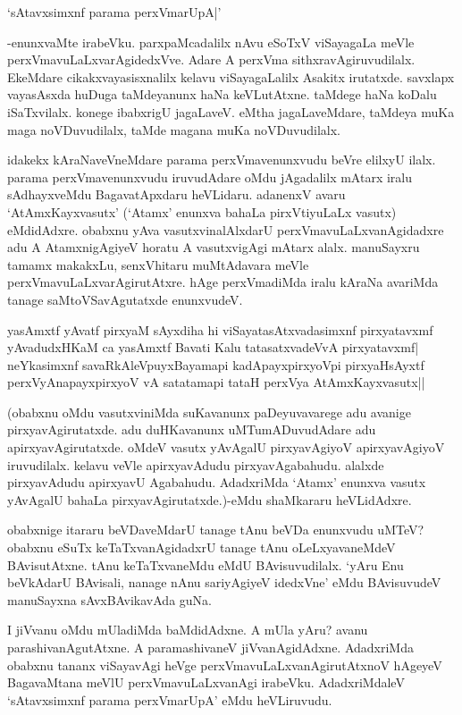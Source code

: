 \begin{shloka}
`sAtavxsimxnf parama perxVmarUpA|'
\end{shloka}

-enunxvaMte irabeVku. parxpaMcadalilx nAvu eSoTxV viSayagaLa meVle perxVmavuLaLxvarAgidedxVve. Adare A perxVma sithxravAgiruvudilalx. EkeMdare cikakxvayasisxnalilx kelavu viSayagaLalilx Asakitx irutatxde. savxlapx vayasAsxda huDuga taMdeyanunx haNa keVLutAtxne. taMdege haNa koDalu iSaTxvilalx. konege ibabxrigU jagaLaveV. eMtha jagaLaveMdare, taMdeya muKa maga noVDuvudilalx, taMde magana muKa noVDuvudilalx.

idakekx kAraNaveVneMdare parama perxVmavenunxvudu beVre elilxyU ilalx. parama perxVmavenunxvudu iruvudAdare oMdu jAgadalilx mAtarx iralu sAdhayxveMdu BagavatApxdaru heVLidaru. adanenxV avaru `AtAmxKayxvasutx' (`Atamx' enunxva bahaLa pirxVtiyuLaLx vasutx) eMdidAdxre. obabxnu yAva vasutxvinalAlxdarU perxVmavuLaLxvanAgidadxre adu A AtamxnigAgiyeV horatu A vasutxvigAgi mAtarx alalx. manuSayxru tamamx makakxLu, senxVhitaru muMtAdavara meVle perxVmavuLaLxvarAgirutAtxre. hAge perxVmadiMda iralu kAraNa avariMda tanage saMtoVSavAgutatxde enunxvudeV.

\begin{shloka}
yasAmxtf yAvatf pirxyaM sAyxdiha hi viSayatasAtxvadasimxnf pirxyatavxmf\\
yAvadudxHKaM ca yasAmxtf Bavati Kalu tatasatxvadeVvA pirxyatavxmf|\\
neYkasimxnf savaRkAleV\s puyxBayamapi kadA\s payxpirxyoV\s pi pirxyaHsAyxtf\\
perxVyAnapayxpirxyoV vA satatamapi tataH perxVya AtAmxKayxvasutx||
\end{shloka}

(obabxnu oMdu vasutxviniMda suKavanunx paDeyuvavarege adu avanige pirxyavAgirutatxde. adu duHKavanunx uMTumADuvudAdare adu apirxyavAgirutatxde. oMdeV vasutx yAvAgalU pirxyavAgiyoV apirxyavAgiyoV iruvudilalx. kelavu veVle apirxyavAdudu pirxyavAgabahudu. alalxde pirxyavAdudu apirxyavU Agabahudu. AdadxriMda `Atamx' enunxva vasutx yAvAgalU bahaLa pirxyavAgirutatxde.)-eMdu shaMkararu heVLidAdxre.

obabxnige itararu beVDaveMdarU tanage tAnu beVDa enunxvudu uMTeV? obabxnu eSuTx keTaTxvanAgidadxrU tanage tAnu oLeLxyavaneMdeV BAvisutAtxne. tAnu keTaTxvaneMdu eMdU BAvisuvudilalx. `yAru Enu beVkAdarU BAvisali, nanage nAnu sariyAgiyeV idedxVne' eMdu BAvisuvudeV manuSayxna sAvxBAvikavAda guNa.

I jiVvanu oMdu mUladiMda baMdidAdxne. A mUla yAru? avanu parashivanAgutAtxne. A paramashivaneV jiVvanAgidAdxne. AdadxriMda obabxnu tananx viSayavAgi heVge perxVmavuLaLxvanAgirutAtxnoV hAgeyeV BagavaMtana meVlU perxVmavuLaLxvanAgi irabeVku. AdadxriMdaleV `sAtavxsimxnf parama perxVmarUpA' eMdu heVLiruvudu.

